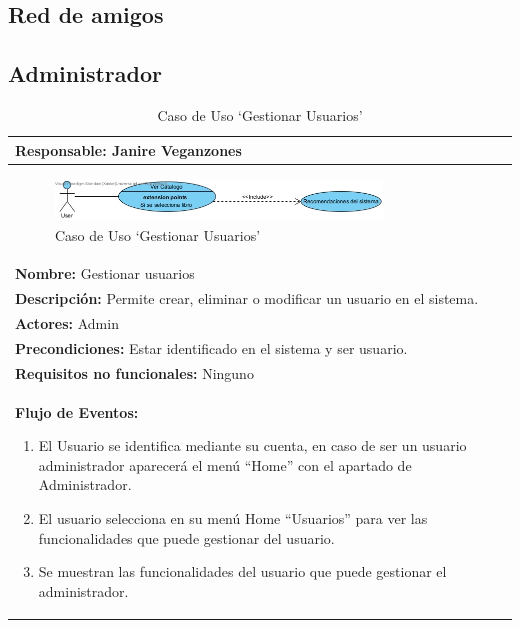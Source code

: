 \documentclass{report}
\begin{document}
        \subsection{Red de amigos}
        \clearpage
        \subsection{Administrador}
        \begin{center}
                \begin{longtable}{|p{\linewidth}|}
                    \hline
                    \textbf{Responsable:} Janire Veganzones\\
                    \hline
                    \begin{figure}[H]
                        \centering
                        \includegraphics[width=0.8\textwidth]{./img/casos_uso/RecomendacionesDelSistema.jpg}
                        \caption{Caso de Uso ‘Gestionar Usuarios’}
                    \end{figure}\\
                    \hline
                    \textbf{Nombre:} Gestionar usuarios\\
                    \hline
                    \textbf{Descripción:}  Permite crear, eliminar o modificar un usuario en el sistema.\\
                    \hline
                    \textbf{Actores:} Admin\\
                    \hline
                    \textbf{Precondiciones:} Estar identificado en el sistema y ser usuario.\\
                    \hline
                    \textbf{Requisitos no funcionales:} Ninguno\\
                    \hline
                    \textbf{Flujo de Eventos:}
                    \begin{enumerate}
                        \item El Usuario se identifica mediante su cuenta, en caso de ser un usuario administrador aparecerá el menú “Home” con el apartado de Administrador.
                        \item El usuario selecciona en su menú Home “Usuarios” para ver las funcionalidades que puede gestionar del usuario.
                        \item Se muestran las funcionalidades del usuario que puede gestionar el administrador.  

\end{enumerate}
\end{longtable}
\end{center}
\end{document}
